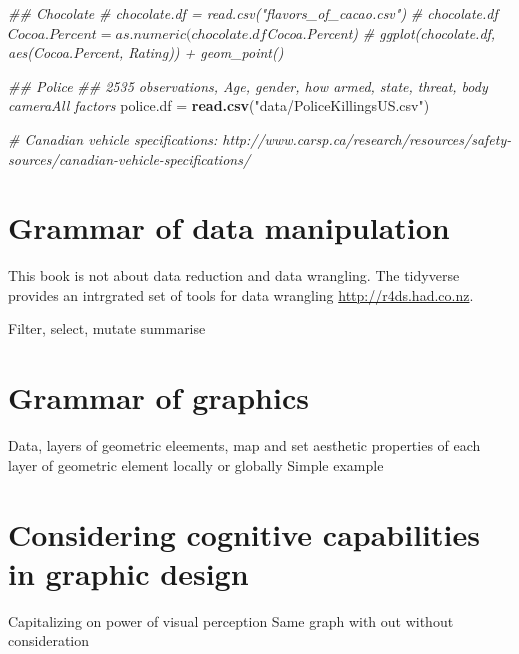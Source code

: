 \documentclass[]{krantz}
\makeatletter
\newenvironment{Shaded}{\begin{snugshade}}{\end{snugshade}}
\newcommand{\CommentTok}[1]{\textcolor[rgb]{0.56,0.35,0.01}{\textit{#1}}}
\newcommand{\KeywordTok}[1]{\textcolor[rgb]{0.13,0.29,0.53}{\textbf{#1}}}
\newcommand{\NormalTok}[1]{#1}
\newcommand{\StringTok}[1]{\textcolor[rgb]{0.31,0.60,0.02}{#1}}
\newenvironment{kframe}{%
\medskip{}
\setlength{\fboxsep}{.8em}
 \def\at@end@of@kframe{}%
 \ifinner\ifhmode%
  \def\at@end@of@kframe{\end{minipage}}%
  \begin{minipage}{\columnwidth}%
 \fi\fi%
 \def\FrameCommand##1{\hskip\@totalleftmargin \hskip-\fboxsep
 \colorbox{shadecolor}{##1}\hskip-\fboxsep
     \hskip-\linewidth \hskip-\@totalleftmargin \hskip\columnwidth}%
 \MakeFramed {\advance\hsize-\width
   \@totalleftmargin\z@ \linewidth\hsize
   \@setminipage}}%
 {\par\unskip\endMakeFramed%
 \at@end@of@kframe}
\renewenvironment{Shaded}{\begin{kframe}}{\end{kframe}}
\makeatother
\begin{document}
\begin{Shaded}
\begin{Highlighting}[]
\CommentTok{## Chocolate}
\CommentTok{# chocolate.df = read.csv("flavors_of_cacao.csv")}
\CommentTok{# chocolate.df$Cocoa.Percent = as.numeric(chocolate.df$Cocoa.Percent)}
\CommentTok{# ggplot(chocolate.df, aes(Cocoa.Percent, Rating)) + geom_point()}


\CommentTok{## Police}
\CommentTok{## 2535 observations, Age, gender, how armed, state, threat, body cameraAll factors}
\NormalTok{ police.df =}\StringTok{ }\KeywordTok{read.csv}\NormalTok{(}\StringTok{"data/PoliceKillingsUS.csv"}\NormalTok{) }

\CommentTok{# Canadian vehicle specifications: http://www.carsp.ca/research/resources/safety-sources/canadian-vehicle-specifications/}
\end{Highlighting}
\end{Shaded}

\hypertarget{grammar-of-data-manipulation}{%
\section{Grammar of data manipulation}\label{grammar-of-data-manipulation}}

This book is not about data reduction and data wrangling. The tidyverse provides an intrgrated set of tools for data wrangling \url{http://r4ds.had.co.nz}.

Filter, select, mutate summarise

\hypertarget{grammar-of-graphics}{%
\section{Grammar of graphics}\label{grammar-of-graphics}}

Data, layers of geometric eleements, map and set aesthetic properties of each layer of geometric element locally or globally
Simple example

\hypertarget{considering-cognitive-capabilities-in-graphic-design}{%
\section{Considering cognitive capabilities in graphic design}\label{considering-cognitive-capabilities-in-graphic-design}}

Capitalizing on power of visual perception
Same graph with out without consideration

\cleardoublepage
\end{document}
